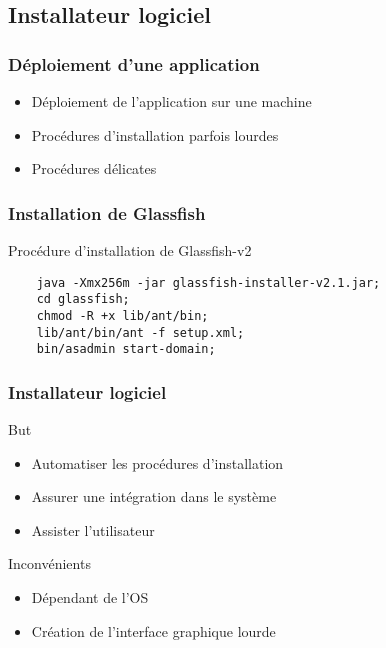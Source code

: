 \subsection{Installateur logiciel}
\begin{frame}\frametitle{Déploiement d'une application}
\begin{itemize}
 \item Déploiement de l'application sur une machine
 \item Procédures d'installation parfois lourdes
 \item Procédures délicates
\end{itemize}
\end{frame}
\begin{frame}[fragile]\frametitle{Installation de Glassfish}
\begin{beamerboxesrounded}[shadow=true]{Proc\'edure d'installation de Glassfish-v2}
	\begin{verbatim}
	java -Xmx256m -jar glassfish-installer-v2.1.jar;
	cd glassfish;
	chmod -R +x lib/ant/bin;
	lib/ant/bin/ant -f setup.xml;
	bin/asadmin start-domain;
	\end{verbatim}
\end{beamerboxesrounded}
\end{frame}
\begin{frame}\frametitle{Installateur logiciel}
\begin{beamerboxesrounded}[shadow=true]{But}
 \begin{itemize}
  \item Automatiser les procédures d'installation
  \item Assurer une intégration dans le système
  \item Assister l'utilisateur
 \end{itemize}
\end{beamerboxesrounded}
	\vfill
\begin{beamerboxesrounded}[shadow=true]{Inconvénients}
 \begin{itemize}
  \item Dépendant de l'OS
  \item Création de l'interface graphique lourde
 \end{itemize}
\end{beamerboxesrounded}
\end{frame}

